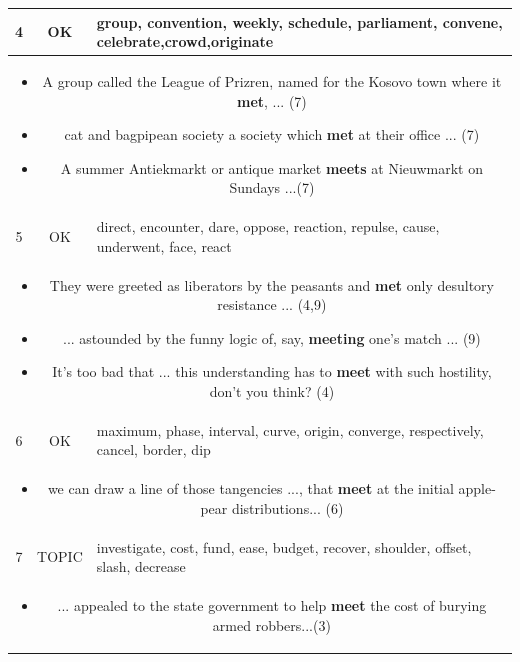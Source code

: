 \documentclass[11pt,a4paper]{article}
\begin{document}
\begin{table}[htp!]
\begin{tabularx}{\linewidth}{| c |  c| X | }
    4  & OK & group, convention, weekly, schedule, parliament, convene, celebrate,crowd,originate \\ \hline
    \multicolumn{3}{|p{0.92\linewidth}|}{
    \begin{itemize}[topsep=0pt,itemsep=0pt, parsep=0pt]
        \item A group called the League of Prizren, named for the Kosovo town where it {\bf met}, ... (7)
        \item cat and bagpipean society a society which {\bf met} at their office ... (7)
      \item A summer Antiekmarkt or antique market {\bf meets} at Nieuwmarkt on Sundays ...(7)
    \end{itemize}
  }\\
  \hline\hline
    5 & OK & direct, encounter, dare, oppose, reaction, repulse, cause, underwent, face, react \\ \hline
    \multicolumn{3}{|p{0.92\linewidth}|}{
    \begin{itemize}[topsep=0pt,itemsep=0pt, parsep=0pt]
        \item They were greeted as liberators by the peasants and {\bf met} only desultory resistance ... (4,9)
        \item ... astounded by the funny logic of, say, {\bf meeting} one's match ... (9)
      \item It's too bad that ... this understanding has to {\bf meet} with such hostility, don't you think? (4)
    \end{itemize}
  }\\
  \hline\hline
    6 & OK & maximum, phase, interval, curve, origin, converge, respectively, cancel, border, dip \\ \hline
    \multicolumn{3}{|p{0.95\linewidth}|}{
    \begin{itemize}[topsep=0pt,itemsep=0pt, parsep=0pt]
        \item we can draw a line of those tangencies ..., that  {\bf meet} at the initial apple-pear distributions... (6)
    \end{itemize}
  }\\
  \hline\hline
  7& TOPIC & investigate, cost, fund, ease, budget, recover, shoulder, offset, slash, decrease \\ \hline
    \multicolumn{3}{|p{0.92\linewidth}|}{
    \begin{itemize}[topsep=0pt,itemsep=0pt, parsep=0pt]
        \item  ... appealed to the state government to help {\bf meet} the cost of burying armed robbers...(3)

\end{itemize}}
\end{tabularx}
\end{table}
\end{document}
